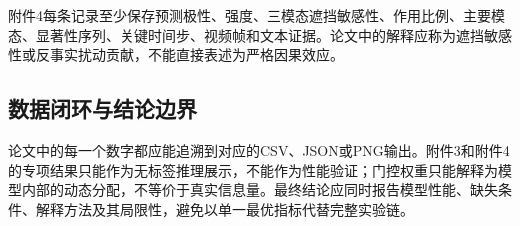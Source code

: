附件4每条记录至少保存预测极性、强度、三模态遮挡敏感性、作用比例、主要模态、显著性序列、关键时间步、视频帧和文本证据。论文中的解释应称为遮挡敏感性或反事实扰动贡献，不能直接表述为严格因果效应。

\subsection{数据闭环与结论边界}

论文中的每一个数字都应能追溯到对应的CSV、JSON或PNG输出。附件3和附件4的专项结果只能作为无标签推理展示，不能作为性能验证；门控权重只能解释为模型内部的动态分配，不等价于真实信息量。最终结论应同时报告模型性能、缺失条件、解释方法及其局限性，避免以单一最优指标代替完整实验链。
